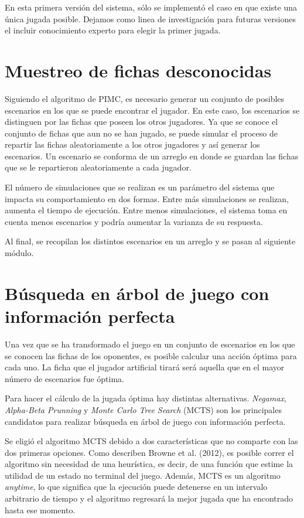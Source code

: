 En esta primera versión del sistema, sólo se implementó el caso en que existe
una única jugada posible. Dejamos como linea de investigación para futuras
versiones el incluir conocimiento experto para elegir la primer jugada.

\section{Muestreo de fichas desconocidas}

Siguiendo el algoritmo de PIMC, es necesario generar un conjunto de posibles
escenarios en los que se puede encontrar el jugador. En este caso, los
escenarios se distinguen por las fichas que poseen los otros jugadores. Ya que
se conoce el conjunto de fichas que aun no se han jugado, se puede simular el
proceso de repartir las fichas aleatoriamente a los otros jugadores y así
generar los escenarios. Un escenario se conforma de un arreglo en donde se
guardan las fichas que se le repartieron aleatoriamente a cada jugador.

El número de simulaciones que se realizan es un parámetro del sistema que
impacta su comportamiento en dos formas. Entre más simulaciones se realizan,
aumenta el tiempo de ejecución. Entre menos simulaciones, el sistema toma en
cuenta menos escenarios y podría aumentar la varianza de su respuesta.

Al final, se recopilan los distintos escenarios en un arreglo y se pasan al
siguiente módulo.

\section{Búsqueda en árbol de juego con información perfecta}

Una vez que se ha transformado el juego en un conjunto de escenarios en los que
se conocen las fichas de los oponentes, es posible calcular una acción óptima
para cada uno. La ficha que el jugador artificial tirará será aquella que en el
mayor número de escenarios fue óptima.

Para hacer el cálculo de la jugada óptima hay distintas alternativas.
\textit{Negamax}, \textit{Alpha-Beta Prunning} y \textit{Monte Carlo Tree
Search} (MCTS) son los principales candidatos para realizar búsqueda en árbol de
juego con información perfecta.

Se eligió el algoritmo MCTS debido a dos características que no comparte con las
dos primeras opciones. Como describen Browne et al. (2012), es posible correr el
algoritmo sin necesidad de una heurística, es decir, de una función que estime
la utilidad de un estado no terminal del juego. Además, MCTS es un algoritmo
\textit{anytime}, lo que significa que la ejecución puede detenerse en un
intervalo arbitrario de tiempo y el algoritmo regresará la mejor jugada que ha
encontrado hasta ese momento.


